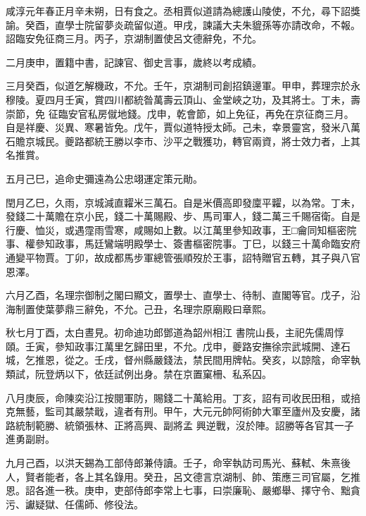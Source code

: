 \begin{pinyinscope}
 咸淳元年春正月辛未朔，日有食之。丞相賈似道請為總護山陵使，不允，尋下詔獎諭。癸酉，直學士院留夢炎疏留似道。甲戌，諫議大夫朱貔孫等亦請改命，不報。詔臨安免征商三月。丙子，京湖制置使呂文德辭免，不允。



 二月庚申，置籍中書，記諫官、御史言事，歲終以考成績。



 三月癸酉，似道乞解機政，不允。壬午，京湖制司創招鎮邊軍。甲申，葬理宗於永穆陵。夏四月壬寅，賞四川都統昝萬壽云頂山、金堂峽之功，及其將士。丁未，壽崇節，免
 征臨安官私房僦地錢。戊申，乾會節，如上免征，再免在京征商三月。自是祥慶、災異、寒暑皆免。戊午，賈似道特授太師。己未，幸景靈宮，發米八萬石贍京城民。夔路都統王勝以李市、沙平之戰獲功，轉官兩資，將士效力者，上其名推賞。



 五月己巳，追命史彌遠為公忠翊運定策元勛。



 閏月乙巳，久雨，京城減直糶米三萬石。自是米價高即發廩平糶，以為常。丁未，發錢二十萬贍在京小民，錢二十萬賜殿、步、馬司軍人，錢二萬三千賜宿衛。自是
 行慶、恤災，或遇霪雨雪寒，咸賜如上數。以江萬里參知政事，王□龠同知樞密院事、權參知政事，馬廷鸞端明殿學士、簽書樞密院事。丁巳，以錢三十萬命臨安府通變平物賈。丁卯，故成都馬步軍總管張順歿於王事，詔特贈官五轉，其子與八官恩澤。



 六月乙酉，名理宗御制之閣曰顯文，置學士、直學士、待制、直閣等官。戊子，沿海制置使葉夢鼎三辭免，不允。己丑，名理宗原廟殿曰章熙。



 秋七月丁酉，太白晝見。初命迪功郎鄧道為韶州相江
 書院山長，主祀先儒周惇頤。壬寅，參知政事江萬里乞歸田里，不允。戊申，夔路安撫徐宗武城開、達石城，乞推恩，從之。壬戌，督州縣嚴錢法，禁民間用牌帖。癸亥，以諒陰，命宰執類試，阮登炳以下，依廷試例出身。禁在京置窠柵、私系囚。



 八月庚辰，命陳奕沿江按閱軍防，賜錢二十萬給用。丁亥，詔有司收民田租，或掊克無藝，監司其嚴禁戢，違者有刑。甲午，大元元帥阿術帥大軍至廬州及安慶，諸路統制範勝、統領張林、正將高興、副將孟
 興逆戰，沒於陣。詔勝等各官其一子進勇副尉。



 九月己酉，以洪天錫為工部侍郎兼侍讀。壬子，命宰執訪司馬光、蘇軾、朱熹後人，賢者能者，各上其名錄用。癸丑，呂文德言京湖制、帥、策應三司官屬，乞推恩。詔各進一秩。庚申，吏部侍郎李常上七事，曰崇廉恥、嚴鄉舉、擇守令、黜貪污、讞疑獄、任儒師、修役法。




\end{pinyinscope}

